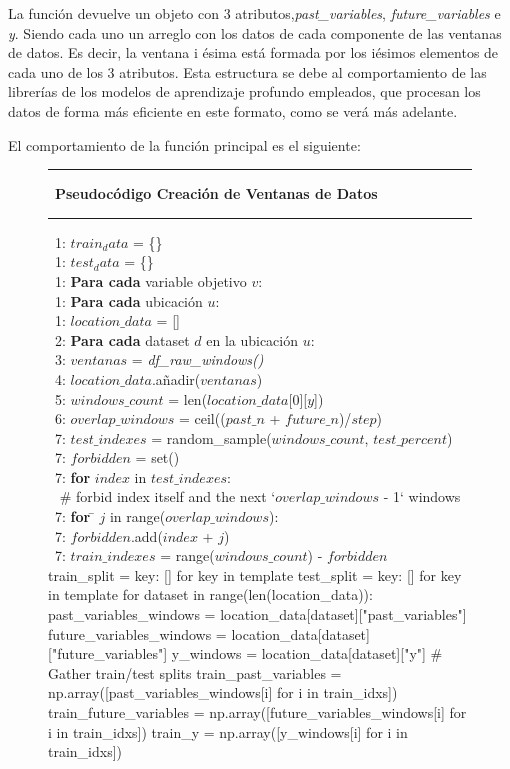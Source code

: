 La función devuelve un objeto con 3 atributos,\textit{past\_variables}, \textit{future\_variables} e \textit{y}.
Siendo cada uno un arreglo con los datos de cada componente de las ventanas de datos. Es decir, la ventana i ésima
está formada por los iésimos elementos de cada uno de los 3 atributos. Esta estructura se debe al comportamiento
de las librerías de los modelos de aprendizaje profundo empleados, que procesan los datos de forma más eficiente en este formato,
como se verá más adelante.

\bigskip
El comportamiento de la función principal es el siguiente:

\begin{figure}[H]
{\small
 \hrule \
 {\bf\small Pseudocódigo Creación de Ventanas de Datos}
 \hrule
\begin{center}
\begin{tabbing}
\ 1: $train_data$ = \{\} \\
\ 1: $test_data$ = \{\} \\
\ 1: {\bf Par}\={\bf a cada} variable objetivo $v$: \\
\ 1: \> {\bf Par}\={\bf a cada} ubicación $u$:  \\
\ 1: \> $location\_data$ = [] \\
\ 2: \> \> {\bf Par}\={\bf a cada} dataset $d$ en la ubicación $u$:  \\
\ 3: \> \> \> $ventanas$ =  \textit{df\_raw\_windows()} \\
\ 4: \> \> \> $location\_data$.añadir($ventanas$) \\
\ 5: \> \> $windows\_count$ = len($location\_data$[0][$y$]) \\
\ 6: \> \> $overlap\_windows$ = ceil(($past\_n$ + $future\_n$)/$step$) \\
\ 7: \> \> $test\_indexes$ = random\_sample($windows\_count$, $test\_percent$) \\
\ 7: \> \> $forbidden$ = set() \\
\ 7: \> \> {\bf for} $index$ in $test\_indexes$: \\
\    \> \>     \# forbid index itself and the next `$overlap\_windows$ - 1` windows \\
\ 7: \> \> \>   {\bf for} \= $j$ in range($overlap\_windows$): \\
\ 7: \> \> \> \>     $forbidden$.add($index$ + $j$) \\
\ 7: \> \> $train\_indexes$ = range($windows\_count$) - $forbidden$ \\

      train_split = {key: [] for key in template}
      test_split = {key: [] for key in template}
      for dataset in range(len(location_data)):
        past_variables_windows = location_data[dataset]["past_variables"]
        future_variables_windows = location_data[dataset]["future_variables"]
        y_windows = location_data[dataset]["y"]
        # Gather train/test splits
        train_past_variables = np.array([past_variables_windows[i] for i in train_idxs])
        train_future_variables = np.array([future_variables_windows[i] for i in train_idxs])
        train_y = np.array([y_windows[i] for i in train_idxs])


\end{tabbing}
\end{center}}
\end{figure}
